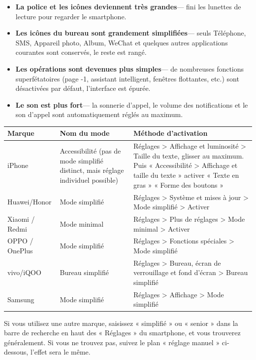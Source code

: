 \begin{itemize}
  \item \textbf{La police et les icônes deviennent très grandes}— fini les lunettes de lecture pour regarder le smartphone.
  \item \textbf{Les icônes du bureau sont grandement simplifiées}— seuls Téléphone, SMS, Appareil photo, Album, WeChat et quelques autres applications courantes sont conservés, le reste est rangé.
  \item \textbf{Les opérations sont devenues plus simples}— de nombreuses fonctions superfétatoires (page -1, assistant intelligent, fenêtres flottantes, etc.) sont désactivées par défaut, l'interface est épurée.
  \item \textbf{Le son est plus fort}— la sonnerie d'appel, le volume des notifications et le son d'appel sont automatiquement réglés au maximum.
\end{itemize}


\begin{center}
\begin{tabularx}{\linewidth}{|X|X|X|}
\hline
\textbf{Marque} & \textbf{Nom du mode} & \textbf{Méthode d'activation} \tabularnewline
\hline
iPhone & Accessibilité (pas de mode simplifié distinct, mais réglage individuel possible) & Réglages > Affichage et luminosité > Taille du texte, glisser au maximum. Puis « Accessibilité > Affichage et taille du texte » activer « Texte en gras » « Forme des boutons » \tabularnewline
Huawei/Honor & Mode simplifié & Réglages > Système et mises à jour > Mode simplifié > Activer \tabularnewline
Xiaomi / Redmi & Mode minimal & Réglages > Plus de réglages > Mode minimal > Activer \tabularnewline
OPPO / OnePlus & Mode simplifié & Réglages > Fonctions spéciales > Mode simplifié \tabularnewline
vivo/iQOO & Bureau simplifié & Réglages > Bureau, écran de verrouillage et fond d'écran > Bureau simplifié \tabularnewline
Samsung & Mode simplifié & Réglages > Affichage > Mode simplifié \tabularnewline
\hline
\end{tabularx}
\end{center}

Si vous utilisez une autre marque, saisissez « simplifié » ou « senior » dans la barre de recherche en haut des « Réglages » du smartphone, et vous trouverez généralement. Si vous ne trouvez pas, suivez le plan « réglage manuel » ci-dessous, l'effet sera le même.

